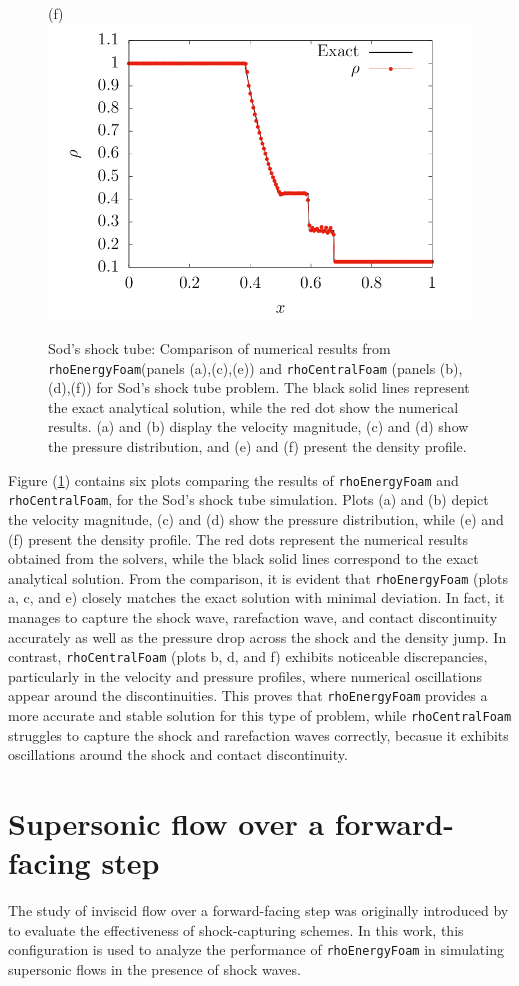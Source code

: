 \documentclass[a5paper]{sapthesis}
\begin{document}
\begin{figure}
		(f)\includegraphics[width=0.45\linewidth]{Figures/Sod_rho_rcf}\\
		\caption[Velocity magnitude, Pressure and denisty plots for the Sod's shock tube case.]{Sod's shock tube: Comparison of numerical results from \texttt{rhoEnergyFoam}(panels (a),(c),(e)) and \texttt{rhoCentralFoam} (panels (b),(d),(f)) for Sod's shock tube problem. The black solid lines represent the exact analytical solution, while the red dot show the numerical results. (a) and (b) display the velocity magnitude, (c) and (d) show the pressure distribution, and (e) and (f) present the density profile.}
		\label{Sod_plots}
	\end{figure}  
	
	\noindent Figure (\ref{Sod_plots}) contains six plots comparing the results of \texttt{rhoEnergyFoam} and \texttt{rhoCentralFoam}, for the Sod's shock tube simulation. Plots (a) and (b) depict the velocity magnitude, (c) and (d) show the pressure distribution, while (e) and (f) present the density profile. The red dots represent the numerical results obtained from the solvers, while the black solid lines correspond to the exact analytical solution. From the comparison, it is evident that \texttt{rhoEnergyFoam} (plots a, c, and e) closely matches the exact solution with minimal deviation. In fact, it manages to capture the shock wave, rarefaction wave, and contact discontinuity accurately as well as the pressure drop across the shock and the density jump. In contrast, \texttt{rhoCentralFoam} (plots b, d, and f) exhibits noticeable discrepancies, particularly in the velocity and pressure profiles, where numerical oscillations appear around the discontinuities. This proves that \texttt{rhoEnergyFoam} provides a more accurate and stable solution for this type of problem, while \texttt{rhoCentralFoam} struggles to capture the shock and rarefaction waves correctly, becasue it exhibits oscillations around the shock and contact discontinuity.
	
	\newpage
	\section{Supersonic flow over a forward-facing step}
	The study of inviscid flow over a forward-facing step was originally introduced by \citet{EMERY1968306} to evaluate the effectiveness of shock-capturing schemes. In this work, this configuration is used to analyze the performance of \texttt{rhoEnergyFoam} in simulating supersonic flows in the presence of shock waves.
	
\end{document}
